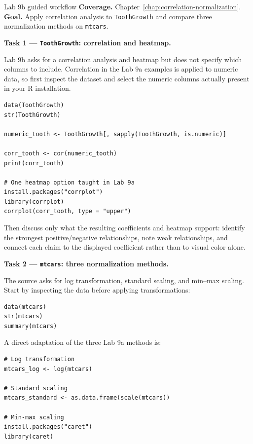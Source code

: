 
\begin{labproject}{Lab 9b guided workflow}
\textbf{Coverage.} Chapter~\ref{chap:correlation-normalization}.\\
\textbf{Goal.} Apply correlation analysis to \texttt{ToothGrowth} and compare three normalization methods on \texttt{mtcars}.

\textbf{Task 1 --- \texttt{ToothGrowth}: correlation and heatmap.}

Lab 9b asks for a correlation analysis and heatmap but does not specify which columns to include. Correlation in the Lab 9a examples is applied to numeric data, so first inspect the dataset and select the numeric columns actually present in your R installation.

\begin{lstlisting}[style=dsr]
data(ToothGrowth)
str(ToothGrowth)

numeric_tooth <- ToothGrowth[, sapply(ToothGrowth, is.numeric)]

corr_tooth <- cor(numeric_tooth)
print(corr_tooth)

# One heatmap option taught in Lab 9a
install.packages("corrplot")
library(corrplot)
corrplot(corr_tooth, type = "upper")
\end{lstlisting}

Then discuss only what the resulting coefficients and heatmap support: identify the strongest positive/negative relationships, note weak relationships, and connect each claim to the displayed coefficient rather than to visual color alone.

\textbf{Task 2 --- \texttt{mtcars}: three normalization methods.}

The source asks for log transformation, standard scaling, and min--max scaling. Start by inspecting the data before applying transformations:

\begin{lstlisting}[style=dsr]
data(mtcars)
str(mtcars)
summary(mtcars)
\end{lstlisting}

A direct adaptation of the three Lab 9a methods is:

\begin{lstlisting}[style=dsr]
# Log transformation
mtcars_log <- log(mtcars)

# Standard scaling
mtcars_standard <- as.data.frame(scale(mtcars))

# Min-max scaling
install.packages("caret")
library(caret)


\end{lstlisting}
\end{labproject}
